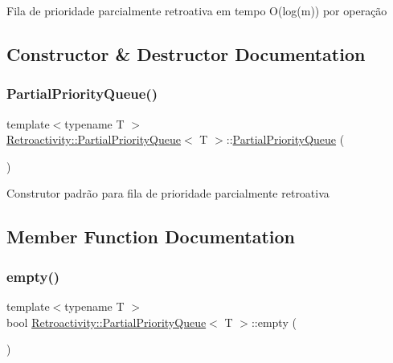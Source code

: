 Fila de prioridade parcialmente retroativa em tempo O(log(m)) por operação 

\subsection{Constructor \& Destructor Documentation}
\mbox{\label{classRetroactivity_1_1PartialPriorityQueue_a3619069dac07012d7da62552aa95b407}} 
\subsubsection{\texorpdfstring{Partial\+Priority\+Queue()}{PartialPriorityQueue()}}
{\footnotesize\ttfamily template$<$typename T $>$ \\
\hyperlink{classRetroactivity_1_1PartialPriorityQueue}{Retroactivity\+::\+Partial\+Priority\+Queue}$<$ T $>$\+::\hyperlink{classRetroactivity_1_1PartialPriorityQueue}{Partial\+Priority\+Queue} (\begin{DoxyParamCaption}{ }\end{DoxyParamCaption})\hspace{0.3cm}{\ttfamily [inline]}}

Construtor padrão para fila de prioridade parcialmente retroativa 

\subsection{Member Function Documentation}
\mbox{\label{classRetroactivity_1_1PartialPriorityQueue_affda050c80b31b4de940183a1b143f59}} 
\subsubsection{\texorpdfstring{empty()}{empty()}}
{\footnotesize\ttfamily template$<$typename T $>$ \\
bool \hyperlink{classRetroactivity_1_1PartialPriorityQueue}{Retroactivity\+::\+Partial\+Priority\+Queue}$<$ T $>$\+::empty (\begin{DoxyParamCaption}{ }\end{DoxyParamCaption})}

